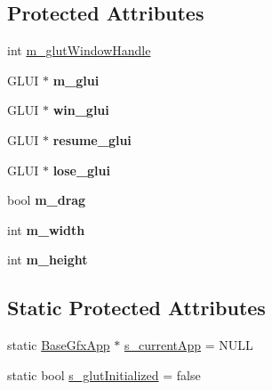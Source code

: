 \subsection*{Protected Attributes}
\begin{DoxyCompactItemize}
\item 
int \hyperlink{classBaseGfxApp_ad8697d6fdd10e6f336c3a662016b4fa7}{m\-\_\-glut\-Window\-Handle}
\item 
\hypertarget{classBaseGfxApp_a6eb1673b80283727221da2242211af1d}{G\-L\-U\-I $\ast$ {\bfseries m\-\_\-glui}}\label{classBaseGfxApp_a6eb1673b80283727221da2242211af1d}

\item 
\hypertarget{classBaseGfxApp_a1df9b89d29761fd44208ba02decca76a}{G\-L\-U\-I $\ast$ {\bfseries win\-\_\-glui}}\label{classBaseGfxApp_a1df9b89d29761fd44208ba02decca76a}

\item 
\hypertarget{classBaseGfxApp_a6d8ae1f07cd0673627fef49baa27e4a8}{G\-L\-U\-I $\ast$ {\bfseries resume\-\_\-glui}}\label{classBaseGfxApp_a6d8ae1f07cd0673627fef49baa27e4a8}

\item 
\hypertarget{classBaseGfxApp_af1dd0795c8f5bdafe89050a42d9f96a4}{G\-L\-U\-I $\ast$ {\bfseries lose\-\_\-glui}}\label{classBaseGfxApp_af1dd0795c8f5bdafe89050a42d9f96a4}

\item 
\hypertarget{classBaseGfxApp_a2e70a389224f8affe7c137f7e20dc8c1}{bool {\bfseries m\-\_\-drag}}\label{classBaseGfxApp_a2e70a389224f8affe7c137f7e20dc8c1}

\item 
\hypertarget{classBaseGfxApp_a7e5ef1c8f25fe081b4a1fd4ce6a96e07}{int {\bfseries m\-\_\-width}}\label{classBaseGfxApp_a7e5ef1c8f25fe081b4a1fd4ce6a96e07}

\item 
\hypertarget{classBaseGfxApp_ac078e4fc20b5c2fe0c744966b850b412}{int {\bfseries m\-\_\-height}}\label{classBaseGfxApp_ac078e4fc20b5c2fe0c744966b850b412}

\end{DoxyCompactItemize}
\subsection*{Static Protected Attributes}
\begin{DoxyCompactItemize}
\item 
static \hyperlink{classBaseGfxApp}{Base\-Gfx\-App} $\ast$ \hyperlink{classBaseGfxApp_a65ba89b98af31e2649a0546631931000}{s\-\_\-current\-App} = N\-U\-L\-L
\item 
static bool \hyperlink{classBaseGfxApp_afa4690383ea27713016ef75b9fb1e42f}{s\-\_\-glut\-Initialized} = false
\end{DoxyCompactItemize}


